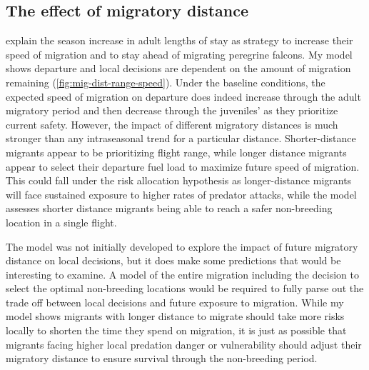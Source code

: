 
\subsection*{The effect of migratory distance}

\citet{Hope2011} explain the season increase in adult lengths of stay as strategy to increase their speed of migration and to stay ahead of migrating peregrine falcons. My model shows departure and local decisions are dependent on the amount of migration remaining (\autoref{fig:mig-dist-range-speed}). Under the baseline conditions, the expected speed of migration on departure does indeed increase through the adult migratory period and then decrease through the juveniles' as they prioritize current safety. However, the impact of different migratory distances is much stronger than any intraseasonal trend for a particular distance. Shorter-distance migrants appear to be prioritizing flight range, while longer distance migrants appear to select their departure fuel load to maximize future speed of migration. This could fall under the risk allocation hypothesis \citep{Lima1999a} as longer-distance migrants will face sustained exposure to higher rates of predator attacks, while the model assesses shorter distance migrants being able to reach a safer non-breeding location in a single flight.

The model was not initially developed to explore the impact of future migratory distance on local decisions, but it does make some predictions that would be interesting to examine. A model of the entire migration including the decision to select the optimal non-breeding locations would be required to fully parse out the trade off between local decisions and future exposure to migration. While my model shows migrants with longer distance to migrate should take more risks locally to shorten the time they spend on migration, it is just as possible that migrants facing higher local predation danger or vulnerability should adjust their migratory distance to ensure survival through the non-breeding period. 


